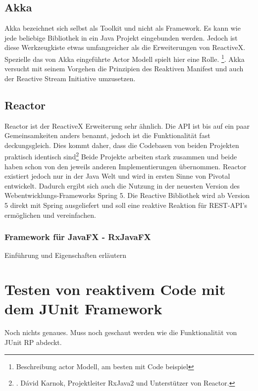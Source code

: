 \subsection{Akka}
Akka bezeichnet sich selbst als Toolkit und nicht als Framework. Es kann wie jede beliebige Bibliothek in ein Java Projekt eingebunden werden. Jedoch ist diese Werkzeugkiste etwas umfangreicher als die Erweiterungen von ReactiveX. Spezielle das von Akka eingeführte Actor Modell spielt hier eine Rolle. \footnote{Beschreibung actor Modell, am besten mit Code beispiel}. Akka versucht mit seinem Vorgehen die Prinzipien des Reaktiven Manifest und auch der Reactive Stream Initiative umzusetzen.
\subsection{Reactor}
Reactor ist der ReactiveX Erweiterung sehr ähnlich. Die API ist bis auf ein paar Gemeinsamkeiten anders benannt, jedoch ist die Funktionalität fast deckungsgleich. Dies kommt daher, dass die Codebasen von beiden Projekten praktisch identisch sind\footnote{\cite{Karnok.2016}. Dávid Karnok, Projektleiter RxJava2 und Unterstützer von Reactor.} Beide Projekte arbeiten stark zusammen und beide haben schon von den jeweils anderen Implementierungen übernommen. Reactor existiert jedoch nur in der Java Welt und wird in ersten Sinne von Pivotal entwickelt. Dadurch ergibt sich auch die Nutzung in der neuesten Version des Webentwicklungs-Frameworks Spring 5. Die Reactive Bibliothek wird ab Version 5 direkt mit Spring ausgeliefert und soll eine reaktive Reaktion für REST-API's ermöglichen und vereinfachen. 
\subsubsection{Framework für JavaFX - RxJavaFX}
Einführung und Eigenschaften erläutern
\section{Testen von reaktivem Code mit dem JUnit Framework}
Noch nichts genaues. Muss noch geschaut werden wie die Funktionalität von JUnit RP abdeckt.